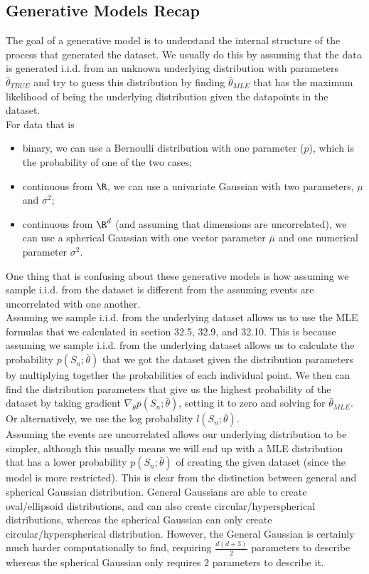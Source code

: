 \documentclass[12pt]{article}
\begin{document}
\subsection{Generative Models Recap}

The goal of a generative model is to understand the internal structure of the process that generated the dataset. We usually do this by assuming that the data is generated i.i.d. from an unknown underlying distribution with parameters $\bar{\theta}_{TRUE}$ and try to guess this distribution by finding $\bar{\theta}_{MLE}$ that has the maximum likelihood of being the underlying distribution given the datapoints in the dataset.\\

For data that is 
 
\begin{itemize}
	\item binary, we can use a Bernoulli distribution with one parameter ($p$), which is the probability of one of the two cases;
	\item continuous from $\R$, we can use a univariate Gaussian with two parameters, $\mu$ and $\sigma^2$;
	\item continuous from $\R^d$ (and assuming that dimensions are uncorrelated), we can use a spherical Gaussian with one vector parameter $\bar{\mu}$ and one numerical parameter $\sigma^2$.
\end{itemize}

One thing that is confusing about these generative models is how assuming we sample i.i.d. from the dataset is different from the assuming events are uncorrelated with one another.\\

Assuming we sample i.i.d. from the underlying dataset allows us to use the MLE formulas that we calculated in section 32.5, 32.9, and 32.10. This is because assuming we sample i.i.d. from the underlying dataset allows us to calculate the probability $p(S_n; \bar{\theta})$ that we got the dataset given the distribution parameters by multiplying together the probabilities of each individual point. We then can find the distribution parameters that give us the highest probability of the dataset by taking gradient $\nabla_{\bar{\theta}} p(S_n;\bar{\theta})$, setting it to zero and solving for $\bar{\theta}_{MLE}$. Or alternatively, we use the log probability $l(S_n;\bar{\theta})$.\\

Assuming the events are uncorrelated allows our underlying distribution to be simpler, although this usually means we will end up with a MLE distribution that has a lower probability $p(S_n; \bar{\theta})$ of creating the given dataset (since the model is more restricted). This is clear from the distinction between general and spherical Gaussian distribution. General Gaussians are able to create oval/ellipsoid distributions, and can also create circular/hyperspherical distributions, whereas the spherical Gaussian can only create circular/hyperspherical distribution. However, the General Gaussian is certainly much harder computationally to find, requiring $\frac {d(d+3)} 2$ parameters to describe whereas the spherical Gaussian only requires $2$ parameters to describe it.
\end{document}
